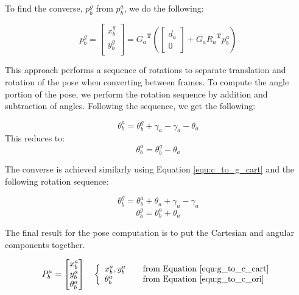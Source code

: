 To find the converse, $p_b^g$ from $p_b^a$, we do the following:


\begin{equation}
\label{equ:c_to_g_cart}
p_b^g =
\begin{bmatrix}
x_b^g \\
y_b^g \\
\end{bmatrix}
 = {G_a}^{\mathbf{T}} \left(
\begin{bmatrix}
d_a \\
0
\end{bmatrix}
+ G_a {R_a}^{\mathbf{T}} p_b^a \right)
\end{equation}


This approach performs a sequence of rotations to separate translation and rotation of the pose when converting between frames. To compute the angle portion of the pose, we perform the rotation sequence by addition and subtraction of angles. Following the sequence, we get the following: 


\begin{equation*}
\theta^a_b = \theta_b^g + \gamma_a - \gamma_a - \theta_a
\end{equation*}
This reduces to:
\begin{equation}
\label{equ:g_to_c_ori}
\theta^a_b = \theta_b^g - \theta_a
\end{equation}


The converse is achieved similarly using Equation \autoref{equ:c_to_g_cart} and the following rotation sequence:


\begin{equation*}
\theta_b^g = \theta_b^a + \theta_a + \gamma_a - \gamma_a 
\end{equation*}
\begin{equation}
\label{equ:c_to_g_ori}
\theta_b^g = \theta_b^a + \theta_a
\end{equation}


The final result for the pose computation is to put the Cartesian and angular components together.


\begin{equation}
P_b^a =
\begin{bmatrix}
x_b^a \\
y_b^a \\
\theta_b^a 
\end{bmatrix}
\quad
\left\{ 
  \begin{array}{l l}
    x_b^a,y_b^a & \quad \text{from Equation \ref{equ:g_to_c_cart}}\\
    \theta_b^a & \quad \text{from Equation \ref{equ:g_to_c_ori}}
  \end{array} \right.
\end{equation}


